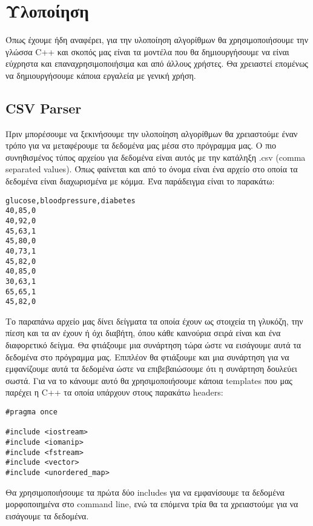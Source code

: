 \newpage
\section{Υλοποίηση}
Όπως έχουμε ήδη αναφέρει, για την υλοποίηση αλγορίθμων θα χρησιμοποιήσουμε την γλώσσα \textlatin{C++} και σκοπός μας είναι τα μοντέλα που θα δημιουργήσουμε να είναι εύχρηστα και επαναχρησιμοποιήσιμα και από
άλλους χρήστες. Θα χρειαστεί επομένως να δημιουργήσουμε κάποια εργαλεία με γενική χρήση.
\subsection{\textlatin{CSV Parser}}
Πριν μπορέσουμε να ξεκινήσουμε την υλοποίηση αλγορίθμων θα χρειαστούμε έναν τρόπο για να μεταφέρουμε τα δεδομένα μας μέσα στο πρόγραμμα μας. Ο πιο συνηθισμένος τύπος αρχείου για δεδομένα είναι αυτός με την
κατάληξη \textlatin{.csv (comma separated values)}. Όπως φαίνεται και από το όνομα είναι ένα αρχείο στο οποία τα δεδομένα είναι διαχωρισμένα με κόμμα. Ένα παράδειγμα είναι το παρακάτω:
\begin{otherlanguage}{english}
\begin{lstlisting}[style=csvstyle, caption = \textlatin{diabetes.csv}]
glucose,bloodpressure,diabetes
40,85,0
40,92,0
45,63,1
45,80,0
40,73,1
45,82,0
40,85,0
30,63,1
65,65,1
45,82,0
\end{lstlisting}
\end{otherlanguage}
Το παραπάνω αρχείο μας δίνει δείγματα τα οποία έχουν ως στοιχεία τη γλυκόζη, την πίεση και τα αν έχουν ή όχι διαβήτη, όπου κάθε καινούρια σειρά είναι και ένα διαφορετικό δείγμα. Θα φτιάξουμε μια συνάρτηση τώρα ώστε να εισάγουμε αυτά τα
δεδομένα στο πρόγραμμα μας. Επιπλέον θα φτιάξουμε και μια συνάρτηση για να εμφανίζουμε αυτά τα δεδομένα ώστε να επιβεβαιώσουμε ότι η συνάρτηση δουλεύει σωστά. Για να το κάνουμε αυτό θα χρησιμοποιήσουμε κάποια \textlatin{templates} που μας
παρέχει η \textlatin{C++} τα οποία υπάρχουν στους παρακάτω \textlatin{headers}:
\begin{otherlanguage}{english}
\begin{lstlisting}[style=cppstyle, caption = parser includes]
#pragma once

#include <iostream>
#include <iomanip>
#include <fstream>
#include <vector>
#include <unordered_map>
\end{lstlisting}
\end{otherlanguage}
Θα χρησιμοποιήσουμε τα πρώτα δύο \textlatin{includes} για να εμφανίσουμε τα δεδομένα μορφοποιημένα στο \textlatin{command line}, ενώ τα επόμενα τρία θα τα χρειαστούμε για να εισάγουμε τα δεδομένα.
